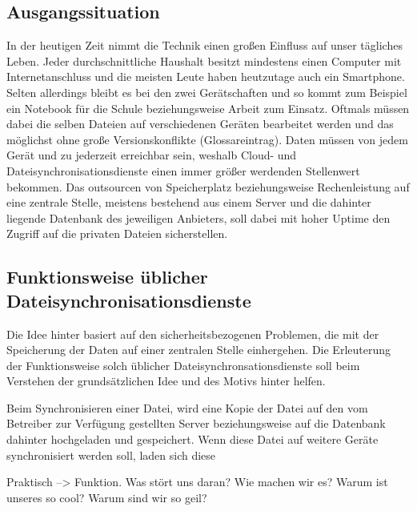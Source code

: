 \subsection{Ausgangssituation}
In der heutigen Zeit nimmt die Technik einen großen Einfluss auf unser tägliches Leben. Jeder durchschnittliche Haushalt besitzt mindestens
einen Computer mit Internetanschluss und die meisten Leute haben heutzutage auch ein Smartphone. Selten allerdings bleibt es bei den zwei
Gerätschaften und so kommt zum Beispiel ein Notebook für die Schule beziehungsweise Arbeit zum Einsatz. Oftmals müssen dabei die selben
Dateien auf verschiedenen Geräten bearbeitet werden und das möglichst ohne große Versionskonflikte (Glossareintrag). Daten müssen von
jedem Gerät und zu jederzeit erreichbar sein, weshalb Cloud- und Dateisynchronisationsdienste einen immer größer werdenden Stellenwert
bekommen. Das outsourcen von Speicherplatz beziehungsweise Rechenleistung auf eine zentrale Stelle, meistens bestehend aus einem Server
und die dahinter liegende Datenbank des jeweiligen Anbieters, soll dabei mit hoher Uptime den Zugriff auf die privaten Dateien sicherstellen. 

\subsection{Funktionsweise üblicher Dateisynchronisationsdienste}
Die Idee hinter \sblit basiert auf den sicherheitsbezogenen Problemen, die mit der Speicherung der Daten auf einer zentralen Stelle
einhergehen. Die Erleuterung der Funktionsweise solch üblicher Dateisynchronsationsdienste soll beim Verstehen der grundsätzlichen Idee und des Motivs hinter \sblit helfen.

Beim Synchronisieren einer Datei, wird eine Kopie der Datei auf den vom Betreiber zur Verfügung gestellten Server beziehungsweise auf die Datenbank dahinter hochgeladen und gespeichert. Wenn diese Datei auf weitere Geräte synchronisiert werden soll, laden sich diese 

Praktisch --> Funktion.
Was stört uns daran?
Wie machen wir es?
Warum ist unseres so cool?
Warum sind wir so geil?
